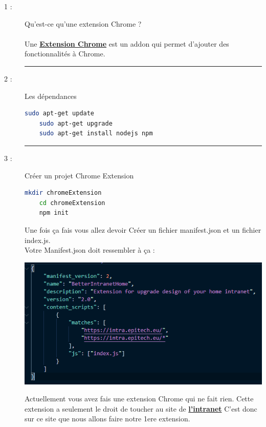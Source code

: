 \documentclass{article}
\begin{document}
    \begin{description}
        \item[1 :]{Qu'est-ce qu'une extension Chrome ?} \\\\ Une \textbf{\href{https://chrome.google.com/webstore/category/extensions?hl=fr&authuser=0}{Extension Chrome}} est un addon qui permet d'ajouter des fonctionnalités à Chrome.
        \begin{center} 
            \rule{0.75\linewidth}{1pt}
        \end{center}
        \item[2 :]{Les dépendances}
\begin{lstlisting}[language=sh]
    sudo apt-get update
    sudo apt-get upgrade
    sudo apt-get install nodejs npm
\end{lstlisting}
        \begin{center} 
            \rule{0.75\linewidth}{1pt}
        \end{center}
        \item[3 :]{Créer un projet Chrome Extension}
\begin{lstlisting}[language=sh]
    mkdir chromeExtension
    cd chromeExtension
    npm init
\end{lstlisting}
        Une fois ça fais vous allez devoir Créer un fichier manifest.json et un fichier index.js.
        \\ Votre Manifest.json doit ressembler à ça :
        \begin{center}
            \includegraphics[scale=0.9]{../images/HowToManifest.PNG}
        \end{center}
        Actuellement vous avez fais une extension Chrome qui ne fait rien.
        Cette extension a seulement le droit de toucher au site de \textbf{\href{https://intra.epitech.eu/}{l'intranet}} C'est donc sur ce site que nous allons faire notre 1ere extension.

\end{description}
\end{document}
